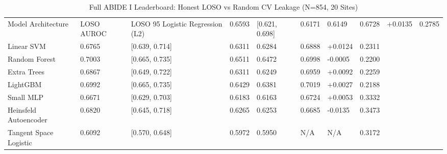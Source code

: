 \begin{table}
\caption{Full ABIDE I Leaderboard: Honest LOSO vs Random CV Leakage (N=854, 20 Sites)}
\label{tab:abide_leaderboard}
\begin{tabular}{llllllll}
\toprule
Model Architecture & LOSO AUROC & LOSO 95%
\midrule
Logistic Regression (L2) & 0.6593 & [0.621, 0.698] & 0.6171 & 0.6149 & 0.6728 & +0.0135 & 0.2785 \\
Linear SVM & 0.6765 & [0.639, 0.714] & 0.6311 & 0.6284 & 0.6888 & +0.0124 & 0.2311 \\
Random Forest & 0.7003 & [0.665, 0.735] & 0.6511 & 0.6472 & 0.6998 & -0.0005 & 0.2200 \\
Extra Trees & 0.6867 & [0.649, 0.722] & 0.6311 & 0.6249 & 0.6959 & +0.0092 & 0.2259 \\
LightGBM & 0.6992 & [0.665, 0.735] & 0.6429 & 0.6381 & 0.7019 & +0.0027 & 0.2188 \\
Small MLP & 0.6671 & [0.629, 0.703] & 0.6183 & 0.6163 & 0.6724 & +0.0053 & 0.3332 \\
Heinsfeld Autoencoder & 0.6820 & [0.645, 0.718] & 0.6265 & 0.6253 & 0.6685 & -0.0135 & 0.3473 \\
Tangent Space Logistic & 0.6092 & [0.570, 0.648] & 0.5972 & 0.5950 & N/A & N/A & 0.3172 \\
\bottomrule
\end{tabular}
\end{table}
